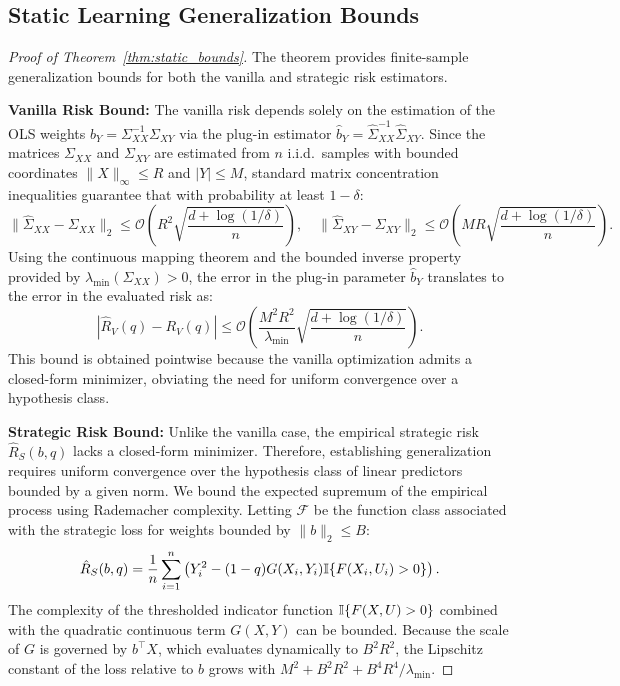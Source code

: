 \subsection{Static Learning Generalization Bounds}
\label{app:static_learning}

\begin{proof}[Proof of Theorem~\ref{thm:static_bounds}]
The theorem provides finite-sample generalization bounds for both the vanilla and strategic risk estimators.

\textbf{Vanilla Risk Bound:}
The vanilla risk depends solely on the estimation of the OLS weights $b_Y = \Sigma_{XX}^{-1}\Sigma_{XY}$ via the plug-in estimator $\hat{b}_Y = \hat{\Sigma}_{XX}^{-1}\hat{\Sigma}_{XY}$. Since the matrices $\Sigma_{XX}$ and $\Sigma_{XY}$ are estimated from $n$ i.i.d.\ samples with bounded coordinates $\|X\|_\infty \le R$ and $|Y| \le M$, standard matrix concentration inequalities guarantee that with probability at least $1-\delta$:
\begin{equation*}
    \|\hat{\Sigma}_{XX} - \Sigma_{XX}\|_2 \le \mathcal{O}\left( R^2 \sqrt{\frac{d + \log(1/\delta)}{n}} \right), \quad 
    \|\hat{\Sigma}_{XY} - \Sigma_{XY}\|_2 \le \mathcal{O}\left( M R \sqrt{\frac{d + \log(1/\delta)}{n}} \right).
\end{equation*}
Using the continuous mapping theorem and the bounded inverse property provided by $\lambda_{\min}(\Sigma_{XX}) > 0$, the error in the plug-in parameter $\hat{b}_Y$ translates to the error in the evaluated risk as:
\begin{equation*}
    |\hat{R}_V(q) - R_V(q)| \le \mathcal{O}\left( \frac{M^2 R^2}{\lambda_{\min}} \sqrt{\frac{d + \log(1/\delta)}{n}} \right).
\end{equation*}
This bound is obtained pointwise because the vanilla optimization admits a closed-form minimizer, obviating the need for uniform convergence over a hypothesis class.

\textbf{Strategic Risk Bound:}
Unlike the vanilla case, the empirical strategic risk $\hat{R}_S(b, q)$ lacks a closed-form minimizer. Therefore, establishing generalization requires uniform convergence over the hypothesis class of linear predictors bounded by a given norm. We bound the expected supremum of the empirical process using Rademacher complexity. Letting $\mathcal{F}$ be the function class associated with the strategic loss for weights bounded by $\|b\|_2 \le B$:
\begin{align*}
    \hat{R}_S(b,q) = \frac{1}{n} \sum_{i=1}^n \left( Y_i^2 - (1-q) G(X_i, Y_i)\mathbb{I}\{F(X_i, U_i) > 0\} \right).
\end{align*}
The complexity of the thresholded indicator function $\mathbb{I}\{F(X, U) > 0\}$ combined with the quadratic continuous term $G(X, Y)$ can be bounded. Because the scale of $G$ is governed by $b^\top X$, which evaluates dynamically to $B^2 R^2$, the Lipschitz constant of the loss relative to $b$ grows with $M^2 + B^2R^2 + B^4R^4/\lambda_{\min}$. 


\end{proof}
